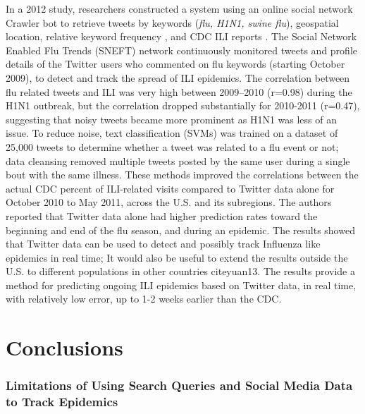 \documentclass[sigconf]{acmart}
\begin{document}
In a 2012 study, researchers constructed a system using an online social network Crawler 
bot to retrieve tweets by keywords ({\it flu, H1N1, swine flu}), geospatial location, 
relative keyword frequency , and CDC ILI reports \cite{achrekar12}. The Social Network 
Enabled Flu Trends (SNEFT) network continuously monitored tweets and profile details of 
the Twitter users who commented on flu keywords (starting October 2009), to detect and 
track the spread of ILI epidemics. The correlation between flu related tweets and ILI 
was  very high between 2009–2010 (r=0.98) during the H1N1 outbreak, but the correlation 
dropped substantially for 2010-2011 (r=0.47), suggesting that noisy tweets became more 
prominent as H1N1 was less of an issue. To reduce noise, text classification (SVMs) was 
trained on a dataset of 25,000 tweets to determine whether a tweet was related to a flu 
event or not; data cleansing removed multiple tweets posted by the same user during a 
single bout with the same illness. These methods improved the correlations between the 
actual CDC percent of ILI-related visits compared to Twitter data alone for October 2010 
to May 2011, across the U.S. and its subregions. The authors reported that Twitter data 
alone had higher prediction rates toward the beginning and end of the flu season, and 
during an epidemic. The results showed that Twitter data can be used to detect and possibly
track Influenza like epidemics in real time; It would also be useful to extend the results 
outside the U.S. to different populations  in other countries cite{yuan13}. The results 
provide a method for predicting ongoing ILI epidemics based on Twitter data, in real 
time, with relatively low error, up to 1-2 weeks earlier than the CDC. 


\section{Conclusions}

\subsubsection{Limitations of Using Search Queries and Social Media Data to Track Epidemics}
\end{document}

